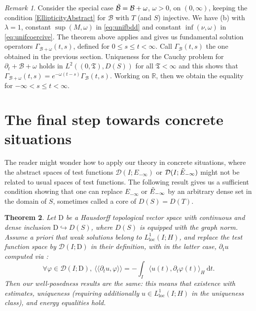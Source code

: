 \documentclass[11pt, letterpaper]{amsart}
\newtheorem{thm}{Theorem}[section]
\theoremstyle{definition}
\theoremstyle{remark}
\newtheorem{rem}[thm]{Remark}
\newcommand{\llangle}{\langle\!\langle}
\newcommand{\rrangle}{\rangle\!\rangle}
\numberwithin{equation}{section}
\begin{document}
\begin{rem}
Consider the special case  $\Tilde{\mathcal{B}}=\mathcal{B}+ \omega$, $\omega>0$, on $(0,\infty)$, keeping the condition \eqref{EllipticityAbstract} for $\mathcal{B}$ with $T$ (and $S$) injective. We have (b) with $\lambda=1$, constant  $\sup(M,\omega)$ in \eqref{eq:unifbdd}    and constant  $\inf(\nu, \omega)$ in \eqref{eq:unifcoercive}.
 The theorem above applies and  gives us  fundamental solution operators  $\Gamma_{\mathcal{B}+ \omega}(t,s)$, defined for $0\le s\le t<\infty$.  Call $\Gamma_{\mathcal{B}}(t,s)$ the one obtained in the previous section. Uniqueness for the Cauchy problem for  $\partial_t + \mathcal{B}+ \omega$ holds in  $L^2((0,\mathfrak{T}), D(S))$ for all $\mathfrak{T}<\infty$ and this shows that   $  \Gamma_{\mathcal{B}+ \omega}(t,s)=e^{-\omega(t-s)}\Gamma_{\mathcal{B}}(t,s)$. Working on $\mathbb{R}$, then we obtain the equality for  $-\infty< s\le t<\infty$.
\end{rem}

\section{The final step towards concrete situations}\label{subsection 4.9} 
The reader might wonder how to apply our theory in concrete situations, where  the abstract  spaces of test functions $\mathcal{D}(I;E_{-\infty})$ or $\mathcal{D}(I;\Tilde{E}_{-\infty})$  might not be related to usual spaces of test functions.
The following result gives us a sufficient condition showing that one can replace $E_{-\infty}$ or $\Tilde{E}_{-\infty}$ by an arbitrary dense set in the domain of $S$, sometimes called a core of $D(S)=D(T)$.

\begin{thm}\label{thm: passage au concret} Let $\mathrm{D}$ be a Hausdorff topological vector space with continuous and dense inclusion $\mathrm{D} \hookrightarrow D(S)$, where $D(S)$ is equipped with the graph norm. Assume a priori  that weak solutions belong to  $L^1_{\mathrm{loc}}(I;H)$, and replace the test function space  by $\mathcal{D}(I;\mathrm{D})$ in their definition, with in the latter case, $\partial_t u $  computed via  : $$\forall \varphi \in  \mathcal{D}(I;\mathrm{D}), \  \llangle  \partial_t u,  \varphi \rrangle = -\int_I \langle u(t),\partial_t\varphi(t)\rangle_{H} \ \mathrm{d}t.$$
Then our well-posedness results are the same: this means that existence with estimates, uniqueness (requiring additionally $u\in L^1_{\mathrm{loc}}(I;H)$ in the uniqueness class), and energy equalities hold. 
\end{thm}
\end{document}
